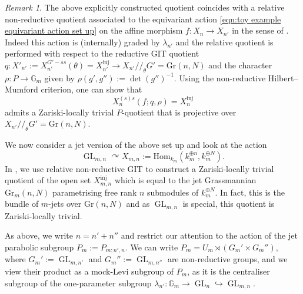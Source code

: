 \documentclass[a4paper,12pt]{article}
\theoremstyle{definition}
\theoremstyle{plain}
\theoremstyle{remark}
\newtheorem{remark}[definition]{Remark}
\DeclareMathOperator{\GL}{GL}
\newcommand\GG{\mathbb{G}}
\newcommand\git{/\!/}
\begin{document}
\begin{remark}
    The above explicitly constructed quotient coincides with a relative non-reductive quotient associated to the equivariant action \cref{eqn:toy example equivariant action set up} on the affine morphism $f \colon X_n \rightarrow X_{n'}$ in the sense of \cite{HHJ}. Indeed this action is (internally) graded by $\lambda_{n'}$ and the relative quotient is performed with respect to the reductive GIT quotient $q \colon X'_{n'} :=X_{n'}^{G'-ss}(\theta) = X_{n'}^{\mathrm{inj}} \rightarrow X_{n'} \git_\theta G' = \mathrm{Gr}(n,N)$ and the character $\rho \colon P \rightarrow \GG_m$ given by $\rho(g',g'') := \det(g'')^{-1}$. Using the non-reductive Hilbert--Mumford criterion, one can show that 
    \[ X_n^{(s)s}(f;q,\rho) = X_n^{\mathrm{inj}}\]
    admits a Zariski-locally trivial $P$-quotient that is projective over  $X_{n'} \git_\theta G' = \mathrm{Gr}(n,N)$. 
\end{remark}

We now consider a jet version of the above set up and look at the action 
\begin{equation}\label{eq NRGIT set-up for jet Grassmannian toy model}
    \GL_{m,n} \curvearrowright X_{m,n}:=\mathrm{Hom}_{k_m}(k_m^{\oplus n},k_m^{\oplus N}).
\end{equation}
In \cite[$\S$4.6.1]{HJV25}, we use relative non-reductive GIT to construct a Zariski-locally trivial quotient of the open set $X_{m,n}^{\mathrm{inj}}$ which is equal to the jet Grassmannian $\mathrm{Gr}_m(n,N)$ parametrising free rank $n$ submodules of $k_m^{\oplus N}$. In fact, this is the bundle of $m$-jets over $\mathrm{Gr}(n,N)$ and as $\GL_{m,n}$ is special, this quotient is Zariski-locally trivial.

As above, we write $n = n' + n''$ and restrict our attention to the action of the jet parabolic subgroup $P_m:=P_{m;n',n}$. We can write $P_m = U_m \rtimes (G_m' \times G_m'')$, where $G_m' := \GL_{m,n'}$ and $G_m'':=\GL_{m,n''}$ are non-reductive groups, and we view their product as a mock-Levi subgroup of $P_m$, as it is the centraliser subgroup of the one-parameter subgroup $\lambda_{n'} \colon \GG_m \rightarrow \GL_n\hookrightarrow \GL_{m,n}$. 
\end{document}

